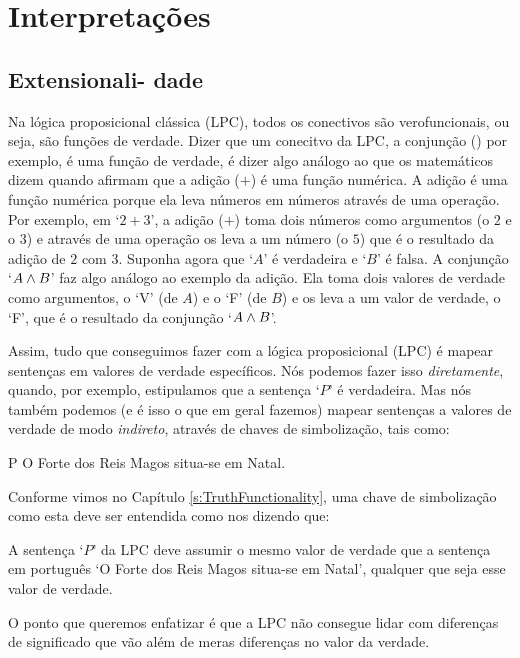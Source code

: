 \part{Interpretações}
\label{ch.semantics}


\chapter[Extensionalidade]{Extensionali- dade}\label{s:Interpretations}

Na lógica proposicional clássica (LPC), todos os conectivos são verofuncionais, ou seja, são funções de verdade.
Dizer que um conecitvo da LPC, a conjunção (\eand) por exemplo, é uma função de verdade, é dizer algo análogo ao que os matemáticos dizem quando afirmam que a adição ($+$) é uma função numérica.
A adição é uma função numérica porque ela leva números em números através de uma operação.
Por exemplo, em  `$2+3$', a adição ($+$) toma dois números como argumentos (o $2$ e o $3$) e através de uma operação os leva a um número (o $5$) que é o resultado da adição de $2$ com $3$.
Suponha agora que `$A$' é verdadeira e `$B$' é falsa. A conjunção `$A\wedge B$' faz algo análogo ao exemplo da adição.
Ela toma dois valores de verdade como argumentos, o `V' (de $A$) e o `F' (de $B$) e os leva a um valor de verdade, o `F', que é o resultado da conjunção `$A\wedge B$'.

Assim, tudo que conseguimos fazer com a lógica proposicional (LPC) é mapear sentenças em valores de verdade específicos.
Nós podemos fazer isso \emph{diretamente}, quando, por exemplo, estipulamos que a sentença `$P$' é verdadeira.
Mas nós também podemos (e é isso o que em geral fazemos) mapear sentenças a valores de verdade de modo \emph{indireto}, através de chaves de simbolização, tais como:
	\begin{ekey}
		\item[P] O Forte dos Reis Magos situa-se em Natal.
	\end{ekey}
Conforme vimos no Capítulo \ref{s:TruthFunctionality}, uma chave de simbolização como esta deve ser entendida como nos dizendo que:
	\begin{ebullet}
		\item A sentença `$P$' da LPC deve assumir o mesmo valor de verdade que a sentença em português `O Forte dos Reis Magos situa-se em Natal', qualquer que seja esse valor de verdade.
	\end{ebullet}
O ponto que queremos enfatizar é que a LPC não consegue lidar com diferenças de significado que vão além de meras diferenças no valor da verdade.


